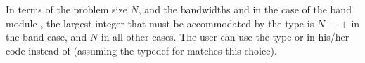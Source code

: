 In terms of the problem size $N$, and the bandwidths  and  
in the case of the band module {\band}, the largest integer that must be 
accommodated by the  type is $N + $  +  in the 
band case, and $N$ in all other cases. The user can use the type  
or  in his/her code instead of  (assuming the 
typedef for  matches this choice).